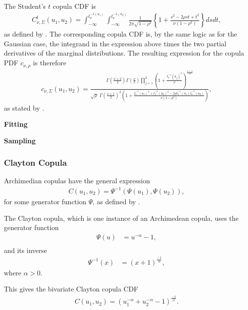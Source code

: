 The Student's $t$ copula \gls{CDF} is 
\begin{align*}
     C_{\nu,\Sigma}^t (u_1,u_2)
    = \int_{-\infty}^{t_\nu^{-1(u_1)}}\int_{-\infty}^{t_\nu^{-1(u_2)}}
    \frac{1}{2\pi\sqrt{1-\rho^2}} \left\{  1+ \frac{s^2-2\rho st+t^2}{\nu(1-\rho^2)}   \right\} dsdt,
\end{align*}
as defined by \citet[p.~116]{Umberto2004copulaMethods}. The corresponding copula \gls{CDF} is, by the same logic as for the Gaussian case, the integrand in the expression above times the two partial derivatives of the marginal distributions. The resulting expression for the copula \gls{PDF} $c_{\nu,\rho}$ is therefore 
\begin{align*}
    c_{\nu,\Sigma}(u_1,u_2) = \frac{\Gamma(\frac{\nu+2}{2})\Gamma(\frac{\nu}{2})\prod_{j=1}^2\left( 1+ \frac{t_\nu^{-1}(u_j)^2}{\nu}\right)^{\frac{\nu+2}{2}} } {\sqrt{\rho} \;\Gamma(\frac{\nu+1}{2})^{2}\left( 1+ \frac{t_\nu^{-1}(u_1)^2 + t_\nu^{-1}(u_2)^2 -2\rho t_\nu^{-1}(u_1) t_\nu^{-1}(u_2) }{\nu(1-\rho^2)}\right)},
\end{align*}
as stated by \citet[p.~117]{Umberto2004copulaMethods}.

\textbf{Fitting}


\textbf{Sampling}

\subsubsection{Clayton Copula}
Archimedian copulas have the general expression  
\begin{align*}
    C(u_1,u_2) = \Psi^{-1}(\Psi(u_1),\Psi(u_2)),
\end{align*}
for some generator function $\Psi$, as defined by \citet[p.~150]{Umberto2004copulaMethods}.

The Clayton copula, which is one instance of an Archimedean copula, uses the generator function
\begin{align*}
    \Psi(u) &=u^{-\alpha}-1, \\
\end{align*}
and its inverse
\begin{align*}
    \Psi^{-1}(x) &= (x+1)^{\frac{-1}{\alpha}},
\end{align*}
where $\alpha > 0$. 

This gives the bivariate Clayton copula \gls{CDF}
\begin{align*}
    C(u_1,u_2) = (u_1^{-\alpha} + u_2^{-\alpha}-1)^{\frac{-1}{\alpha}}.
\end{align*}


